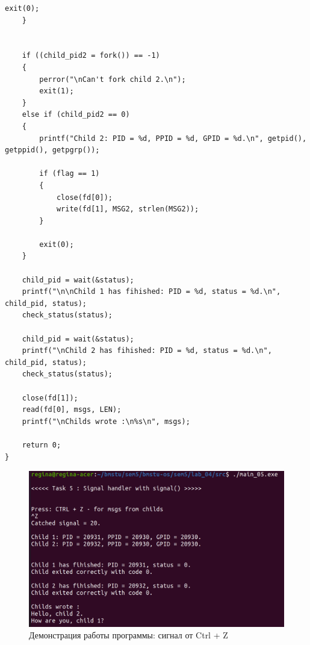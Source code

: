 \begin{center}
\begin{lstlisting}[label=lst:signal,caption=Системный вызов signal()]
        exit(0);
    }


    if ((child_pid2 = fork()) == -1)
    {
        perror("\nCan't fork child 2.\n");
        exit(1);
    }
    else if (child_pid2 == 0)
    {
        printf("Child 2: PID = %d, PPID = %d, GPID = %d.\n", getpid(), getppid(), getpgrp());

        if (flag == 1)
        {
            close(fd[0]);
            write(fd[1], MSG2, strlen(MSG2));
        }

        exit(0);
    }

    child_pid = wait(&status);
    printf("\n\nChild 1 has fihished: PID = %d, status = %d.\n", child_pid, status);
    check_status(status);

    child_pid = wait(&status);
    printf("\nChild 2 has fihished: PID = %d, status = %d.\n", child_pid, status);
    check_status(status);

    close(fd[1]);
    read(fd[0], msgs, LEN);
    printf("\nChilds wrote :\n%s\n", msgs);

    return 0;
}
\end{lstlisting}
\end{center}

\begin{figure}[H]
	\begin{center}
		\includegraphics[scale=0.3]{inc/ctrlz.png}
	\end{center}
	\captionsetup{justification=centering}
	\caption{Демонстрация работы программы: сигнал от Ctrl + Z}
	\label{img:ctrlz}
\end{figure}

